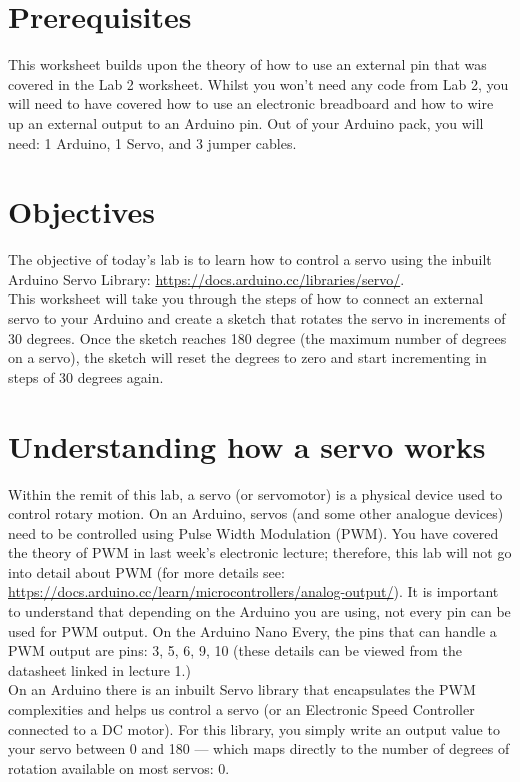 \documentclass[11pt,a4paper]{article}
\begin{document}
\pagestyle{fancy}

\section*{Prerequisites}
This worksheet builds upon the theory of how to use an external pin that was covered in the Lab 2 worksheet. Whilst you won't need any code from Lab 2, you will need to have covered how to use an electronic breadboard and how to wire up an external output to an Arduino pin. Out of your Arduino pack, you will need: 1 Arduino, 1 Servo, and 3 jumper cables.

\section*{Objectives}
The objective of today's lab is to learn how to control a servo using the inbuilt Arduino Servo Library: \url{https://docs.arduino.cc/libraries/servo/}.\\

\noindent
This worksheet will take you through the steps of how to connect an external servo to your Arduino and create a sketch that rotates the servo in increments of 30 degrees. Once the sketch reaches 180 degree (the maximum number of degrees on a servo), the sketch will reset the degrees to zero and start incrementing in steps of 30 degrees again.

\section*{Understanding how a servo works}
Within the remit of this lab, a servo (or servomotor) is a physical device used to control rotary motion. On an Arduino, servos (and some other analogue devices) need to be controlled using Pulse Width Modulation (PWM). You have covered the theory of PWM in last week's electronic lecture; therefore, this lab will not go into detail about PWM (for more details see: \url{https://docs.arduino.cc/learn/microcontrollers/analog-output/}). It is important to understand that depending on the Arduino you are using, not every pin can be used for PWM output. On the Arduino Nano Every, the pins that can handle a PWM output are pins: 3, 5, 6, 9, 10 (these details can be viewed from the datasheet linked in lecture 1.)\\

\noindent
On an Arduino there is an inbuilt Servo library that encapsulates the PWM complexities and helps us control a servo (or an Electronic Speed Controller connected to a DC motor). For this library, you simply write an output value to your servo between 0 and 180 --- which maps directly to the number of degrees of rotation available on most servos: 0.\\
\end{document}
